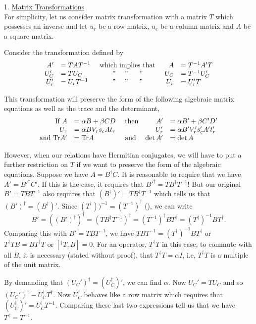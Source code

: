 1. \underline{Matrix Transformations}\\
For simplicity, let us consider matrix transformation with a matrix $T$ which possesses an inverse and let $u_r$ be a row matrix, $u_e$ be a column matrix and $A$ be a square matrix. 

Consider the transformation defined by 
\[ \begin{array}{rlcrl}
   A'  &= TAT^{-1}      &\mbox{ which implies that } & A      &= T^{-1}A'T\\
   U_C' &= TU_C      &\null      "~~~~   "~~~~~"     & U_C &= T^{-1} U_C' \\
   U_r' &= U_rT^{-1}  &\null      "~~~~   "~~~~~"     & U_r &= U_r' T 
\end{array}\]

This transformation will preserve the form of the following algebraic matrix equations as well as the trace and the determinant,
\[ \begin{array}{rlcrl}
\mbox{If } A  &= \alpha B + \beta CD      &\mbox{ then} &A' &= \alpha B' + \beta C' D' \\
   U_r  &=  \alpha B V_r s_c A t_r &\null               & U_r'  &= \alpha B' V_r' s_c' A' t_r'\\
  \mbox{and } \Tr A'  &= \Tr A                  &\mbox{ and }             & \det A'  &= \det A
\end{array}\]
 
 However, when our relations have Hermitian conjugates, we will have to put a further restriction on $T$ if we want to preserve the form of the algebraic equations. 
 Suppose we have $A = B^\dagger C$. It is reasonable to require that we have $A' = B'^\dagger C'$. If this is the case, it requires that $B'^\dagger = T B^\dagger T^{-1}$!
 But our original $B' = TBT^{-1}$ also requires that $(B^\dagger)' = T B^\dagger T^{-1}$ which tells us that $(B')^\dagger = (B^\dagger)'$. 
 Since $(T^\dagger))^{-1} = (T^{-1})^\dagger$ (), we can write 
 $$B' = ((B')^\dagger)^\dagger = (TB^\dagger T^{-1})^\dagger  = (T^{-1})^\dagger B T^\dagger = (T^\dagger)^{-1} B T^\dagger.$$ 
 Comparing this with $B' = TBT^ {-1}$, we have $TBT^{-1} = (T^\dagger)^{-1} B T^\dagger$ or
 $T^\dagger T B = B T^\dagger T$ or $\left[^\dagger T, B\right] = 0$.
 For an operator, $T^\dagger T$ in this case, to commute with all $B$, it is necessary (stated without proof), that $T^\dagger T = \alpha I$, i.e, $T^\dagger T$ is a multiple of the unit matrix.
 
 By demanding that $(U_C')^\dagger =  (U_C^\dagger)'$, we can find $\alpha$. Now $U_C' = TU_C$ and so $(U_C')^\dagger - U_C^\dagger T^\dagger$. 
 Now $U_C^\dagger$ behaves like a row matrix which requires that $(U_C^\dagger)' = U_C^\dagger T^{-1}$. Comparing these last two expressions tell us that we have $T^\dagger = T^{-1}$.
 
